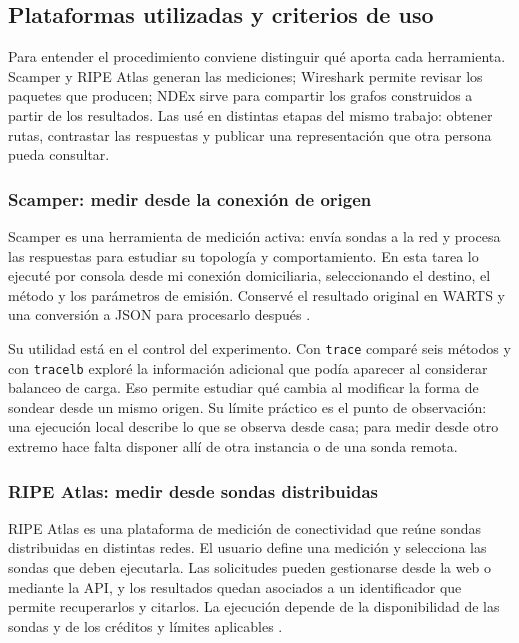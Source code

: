 \subsection{Plataformas utilizadas y criterios de uso}\label{sec:plataformas}

Para entender el procedimiento conviene distinguir qué aporta cada herramienta. Scamper y RIPE Atlas generan las mediciones; Wireshark permite revisar los paquetes que producen; NDEx sirve para compartir los grafos construidos a partir de los resultados. Las usé en distintas etapas del mismo trabajo: obtener rutas, contrastar las respuestas y publicar una representación que otra persona pueda consultar.

\subsubsection{Scamper: medir desde la conexión de origen}

Scamper es una herramienta de medición activa: envía sondas a la red y procesa las respuestas para estudiar su topología y comportamiento. En esta tarea lo ejecuté por consola desde mi conexión domiciliaria, seleccionando el destino, el método y los parámetros de emisión. Conservé el resultado original en WARTS y una conversión a JSON para procesarlo después \cite{ref1}.

Su utilidad está en el control del experimento. Con \texttt{trace} comparé seis métodos y con \texttt{tracelb} exploré la información adicional que podía aparecer al considerar balanceo de carga. Eso permite estudiar qué cambia al modificar la forma de sondear desde un mismo origen. Su límite práctico es el punto de observación: una ejecución local describe lo que se observa desde casa; para medir desde otro extremo hace falta disponer allí de otra instancia o de una sonda remota.

\subsubsection{RIPE Atlas: medir desde sondas distribuidas}

RIPE Atlas es una plataforma de medición de conectividad que reúne sondas distribuidas en distintas redes. El usuario define una medición y selecciona las sondas que deben ejecutarla. Las solicitudes pueden gestionarse desde la web o mediante la API, y los resultados quedan asociados a un identificador que permite recuperarlos y citarlos. La ejecución depende de la disponibilidad de las sondas y de los créditos y límites aplicables \cite{plat_atlas,plat_atlas_udm}.

